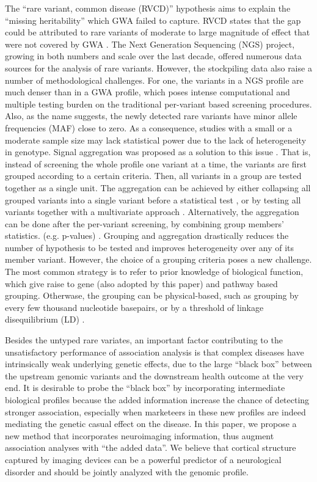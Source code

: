 The “rare variant, common disease (RVCD)” hypothesis aims to explain the “missing heritability” which GWA failed to capture. RVCD states that the gap could be attributed to rare variants of moderate to large magnitude of effect that were not covered by GWA \cite{RVCD1}. The Next Generation Sequencing (NGS) project, growing in both numbers and scale over the last decade, offered numerous data sources for the analysis of rare variants. However, the stockpiling data also raise a number of methodological challenges. For one, the variants in a NGS profile are much denser than in a GWA profile, which poses intense computational and multiple testing burden on the traditional per-variant based screening procedures. Also, as the name suggests, the newly detected rare variants have minor allele frequencies (MAF) close to zero. As a consequence, studies with a small or a moderate sample size may lack statistical power due to the lack of heterogeneity in genotype. Signal aggregation was proposed as a solution to this issue \cite{Burden1, UST1, UST2, SKAT, GCTA, Dai:2015, plink1} . That is, instead of screening the whole profile one variant at a time, the variants are first grouped according to a certain criteria. Then, all variants in a group are tested together as a single unit. The aggregation can be achieved by either collapsing all grouped variants into a single variant before a statistical test \cite{Burden1}, or by testing all variants together with a multivariate approach \cite{UST1, UST2, SKAT, GCTA}. Alternatively, the aggregation can be done after the per-variant screening, by combining group members’ statistics. (e.g. p-values) \cite{Dai:2015, plink1}. Grouping and aggregation drastically reduces the number of hypothesis to be tested and improves heterogeneity over any of its member variant. However, the choice of a grouping criteria poses a new challenge. The most common strategy is to refer to prior knowledge of biological function, which give raise to gene (also adopted by this paper) and pathway based grouping. Otherwase, the grouping can be physical-based, such as grouping by every few thousand nucleotide basepairs, or by a threshold of linkage disequilibrium (LD) \cite{plink1}.

Besides the untyped rare variates, an important factor contributing to the unsatisfactory performance of association analysis is that complex diseases have intrinsically weak underlying genetic effects, due to the large ``black box'' between the upstream genomic variants and the downstream health outcome at the very end. It is desirable to probe the ``black box'' by incorporating intermediate biological profiles because the added information increase the chance of detecting stronger association, especially when marketeers in these new profiles are indeed mediating the genetic casual effect on the disease. In this paper, we propose a new method that incorporates neuroimaging information, thus augment association analyses with “the added data”. We believe that cortical structure captured by imaging devices can be a powerful predictor of a neurological disorder and should be jointly analyzed with the genomic profile.

